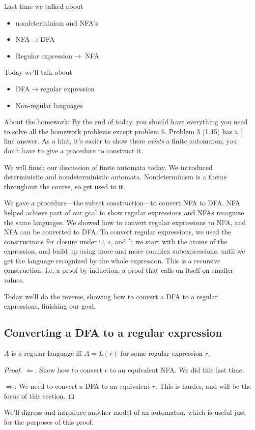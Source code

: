 
Last time we talked about 
\begin{itemize}
\item
nondeterminism and NFA's
\item
NFA$\to $DFA
\item
Regular expression$\to$ NFA
\end{itemize}
Today we'll talk about
\begin{itemize}
\item
DFA$\to $regular expression
\item
Non-regular languages
\end{itemize}

About the homework: By the end of today, you should have everything you need to solve all the homework problems except problem 6. Problem 3 (1.45) has a 1 line answer. As a hint, it's easier to show there {\it exists} a finite automaton; you don't have to give a procedure to construct it.


We will finish our discussion of finite automata today. We introduced deterministic and nondeterministic automata. Nondeterminism is a theme throughout the course, so get used to it.

We gave a procedure---the subset construction---to convert NFA to DFA. NFA helped achieve part of our goal to show regular expressions and NFAs recognize the same languages. We showed how to convert regular expressions to NFA, and NFA can be converted to DFA. To convert regular expressions, we used the constructions for closure under $\cup$, $\circ$, and ${}^*$; we start with the atoms of the expression, and build up using more and more complex subexpressions, until we get the language recognized by the whole expression. This is a recursive construction, i.e. a proof by induction, a %
proof that calls on itself on smaller values.

Today we'll do the reverse, showing how to convert a DFA to a regular expressions, finishing our goal.
\subsection{Converting a DFA to a regular expression}
\begin{thm}
$A$ is a regular language iff $A=L(r)$ for some regular expression $r$.
\end{thm}
\begin{proof}
$\Leftarrow$: Show how to convert $r$ to an equivalent NFA. We did this last time.

$\Rightarrow$: We need to convert a DFA to an equivalent $r$. This is harder, and will be the focus of this section. %
\end{proof}
We'll digress and introduce another model of an automaton, which is useful just for the purposes of this proof.

